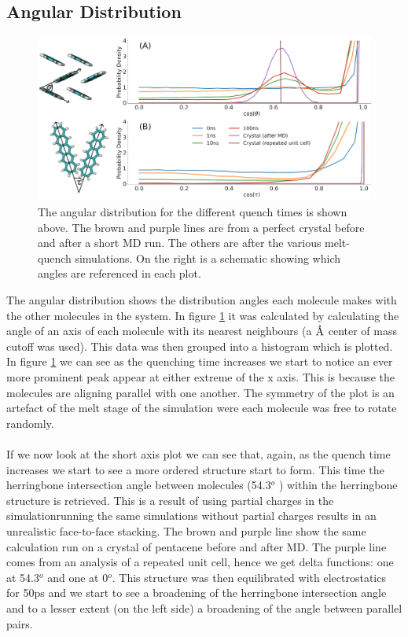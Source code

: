 \subsection{Angular Distribution}
\label{sect:ang_dist}
\begin{figure}[ht]
	\includegraphics[width=\textwidth]{../img/DifferentQuenchTimes/AngularDist.png}
	\caption{\label{fig:ang_dist}
	\noindent The angular distribution for the  different quench times is shown above. The brown and purple lines are from a perfect crystal before and after a short MD run. The others are after the various melt-quench simulations. On the right is a schematic showing which angles are referenced in each plot.}
\end{figure}
\noindent The angular distribution shows the distribution angles each molecule makes with the other molecules in the system. In figure \ref{fig:ang_dist} it was calculated by calculating the angle of an axis of each molecule with its nearest neighbours (a $\text{\normalfont\AA}$ center of mass cutoff was used). This data was then grouped into a histogram which is plotted.
In figure \ref{fig:ang_dist} we can see as the quenching time increases we start to notice an ever more prominent peak appear at either extreme of the x axis. This is because the molecules are aligning parallel with one another. The symmetry of the plot is an artefact of the melt stage of the simulation were each molecule was free to rotate randomly.
\\\\
If we now look at the short axis plot we can see that, again, as the quench time increases we start to see a more ordered structure start to form. This time the herringbone intersection angle between molecules (54.3$^{o}$ \cite{PentaceneAngle}) within the herringbone structure is retrieved. This is a result of using partial charges in the simulation\replace{- }{: }running the same simulations without partial charges results in an unrealistic face-to-face stacking. The brown and purple line show the same calculation run on a crystal of pentacene before and after MD. The purple line comes from an analysis of a repeated unit cell, hence we get  delta functions: one at 54.3$^{o}$ and one at 0$^{o}$. This structure was then equilibrated with electrostatics for 50ps and we start to see a broadening of the herringbone intersection angle and to a lesser extent (on the left side) a broadening of the angle between parallel pairs.
